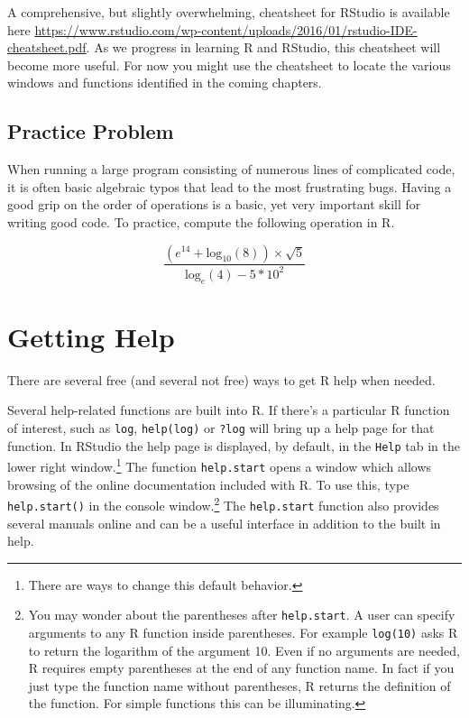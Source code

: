 \documentclass[
]{krantz}
\begin{document}
A comprehensive, but slightly overwhelming, cheatsheet for RStudio is available here \url{https://www.rstudio.com/wp-content/uploads/2016/01/rstudio-IDE-cheatsheet.pdf}. As we progress in learning R and RStudio, this cheatsheet will become more useful. For now you might use the cheatsheet to locate the various windows and functions identified in the coming chapters.

\hypertarget{practice-problem}{%
\subsection{Practice Problem}\label{practice-problem}}

When running a large program consisting of numerous lines of complicated code, it is often basic algebraic typos that lead to the most frustrating bugs. Having a good grip on the order of operations is a basic, yet very important skill for writing good code. To practice, compute the following operation in R.

\[
\frac{(e^{14} + \text{log}_{10}(8)) \times \sqrt{5}}{\text{log}_{e}(4) - 5 * 10^2}
\]

\hypertarget{getting-help}{%
\section{Getting Help}\label{getting-help}}

There are several free (and several not free) ways to get R help when needed.

Several help-related functions are built into R. If there's a particular R function of interest, such as \texttt{log}, \texttt{help(log)} or \texttt{?log} will bring up a help page for that function. In RStudio the help page is displayed, by default, in the \texttt{Help} tab in the lower right window.\footnote{There are ways to change this default behavior.} The function \texttt{help.start} opens a window which allows browsing of the online documentation included with R. To use this, type \texttt{help.start()} in the console window.\footnote{You may wonder about the parentheses after \texttt{help.start}. A user can specify arguments to any R function inside parentheses. For example \texttt{log(10)} asks R to return the logarithm of the argument 10. Even if no arguments are needed, R requires empty parentheses at the end of any function name. In fact if you just type the function name without parentheses, R returns the definition of the function. For simple functions this can be illuminating.} The \texttt{help.start} function also provides several manuals online and can be a useful interface in addition to the built in help.
\end{document}
